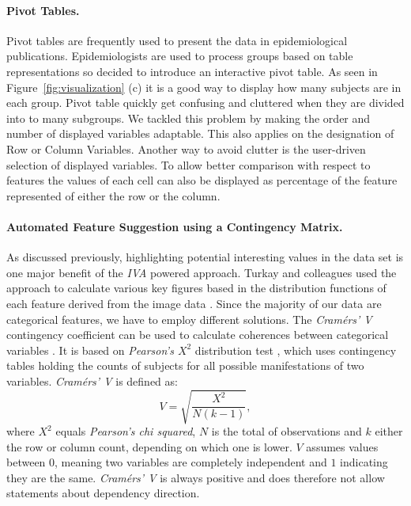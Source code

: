 \documentclass[journal]{style/vgtc} 			          %
\begin{document}
\paragraph{Pivot Tables.}
Pivot tables are frequently used to present the data in epidemiological publications.
%
Epidemiologists are used to process groups based on table representations so decided to introduce an interactive pivot table.
%
As seen in Figure~\ref{fig:visualization} (c) it is a good way to display how many subjects are in each group.
%
Pivot table quickly get confusing and cluttered when they are divided into to many subgroups.
%
We tackled this problem by making the order and number of displayed variables adaptable.
%
This also applies on the designation of Row or Column Variables.
%
Another way to avoid clutter is the user-driven selection of displayed variables.
%
To allow better comparison with respect to features the values of each cell can also be displayed as percentage of the feature represented of either the row or the column.

\paragraph{Automated Feature Suggestion using a Contingency Matrix.}
As discussed previously, highlighting potential interesting values in the data set is one major benefit of the \emph{IVA} powered approach.
%
Turkay and colleagues used the approach to calculate various key figures based in the distribution functions of each feature derived from the image data \cite{Turkay2013}.
%
Since the majority of our data are categorical features, we have to employ different solutions.
%
The \emph{Cram\'{e}rs' V} contingency coefficient can be used to calculate coherences between categorical variables \cite{CramerV}.
%
It is based on \emph{Pearson's $X^2$} distribution test \cite{ChiSquare}, which uses contingency tables holding the counts of subjects for all possible manifestations of two variables.
%
\emph{Cram\'{e}rs' V} is defined as:
\begin{equation}
V = \sqrt{\frac{X^2}{N(k-1)}},
\end{equation}
where $X^2$ equals \emph{Pearson's chi squared}, $N$ is the total of observations and $k$ either the row or column count, depending on which one is lower.
%
$V$ assumes values between $0$, meaning two variables are completely independent and $1$ indicating they are the same.
%
\emph{Cram\'{e}rs' V} is always positive and does therefore not allow statements about dependency direction.
\end{document}

